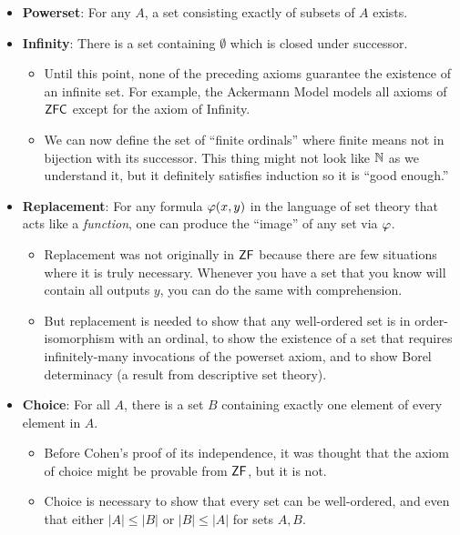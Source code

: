 \documentclass{amsart}
\DeclareMathOperator{\ZFC}{\sf{ZFC}}
\DeclareMathOperator{\ZF}{\sf{ZF}}
\begin{document}
\begin{itemize}
\begin{itemize}
		\end{itemize}
		\item \textbf{Powerset}: For any $A$, a set consisting exactly of subsets of $A$ exists.
		\item \textbf{Infinity}: There is a set containing $\emptyset$ which is closed under successor.
		\begin{itemize}
			\item Until this point, none of the preceding axioms guarantee the existence of an infinite set. For example, the Ackermann Model models all axioms of $\ZFC$ except for the axiom of Infinity.
			\item We can now define the set of ``finite ordinals'' where finite means not in bijection with its successor. This thing might not look like $\mathbb{N}$ as we understand it, but it definitely satisfies induction so it is ``good enough.''
		\end{itemize}
		\item \textbf{Replacement}: For any formula $\varphi(x,y)$ in the language of set theory that acts like a \textit{function}, one can produce the ``image'' of any set via $\varphi$.
		\begin{itemize}
			\item Replacement was not originally in $\ZF$ because there are few situations where it is truly necessary. Whenever you have a set that you know will contain all outputs $y$, you can do the same with comprehension. 
			\item But replacement is needed to show that any well-ordered set is in order-isomorphism with an ordinal, to show the existence of a set that requires infinitely-many invocations of the powerset axiom, and to show Borel determinacy (a result from descriptive set theory).
		\end{itemize}
		\item \textbf{Choice}: For all $A$, there is a set $B$ containing exactly one element of every element in $A$.
		\begin{itemize}
			\item Before Cohen's proof of its independence, it was thought that the axiom of choice might be provable from $\ZF$, but it is not.
			\item Choice is necessary to show that every set can be well-ordered, and even that either $|A|\leq |B|$ or $|B|\leq |A|$ for sets $A,B$.\\
		\end{itemize}
	\end{itemize}
	
\end{document}
